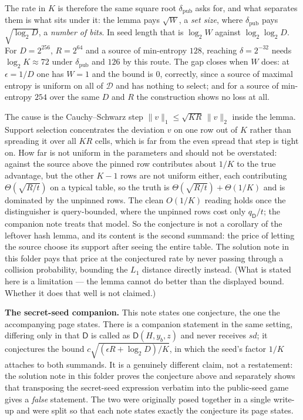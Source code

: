 \documentclass{aicr-conjecture}
\newcommand{\sd}{\mathit{sd}}
\newcommand{\calD}{\mathcal{D}}
\begin{document}
\begin{remark}
The rate in $K$ is therefore the same square root $\delta_{\mathrm{pub}}$ asks for, and what
separates them is what sits under it: the lemma pays $\sqrt{W}$, a \emph{set size}, where
$\delta_{\mathrm{pub}}$ pays $\sqrt{\log_2 D}$, a \emph{number of bits}. In seed length that is
$\log_2 W$ against $\log_2\log_2 D$. For $D = 2^{256}$, $R = 2^{64}$ and a source of min-entropy
$128$, reaching $\delta = 2^{-32}$ needs $\log_2 K \approx 72$ under $\delta_{\mathrm{pub}}$ and
$126$ by this route. The gap closes when $W$ does: at $\epsilon = 1/D$ one has $W = 1$ and the bound
is $0$, correctly, since a source of maximal entropy is uniform on all of $\calD$ and has nothing to
select; and for a source of min-entropy $254$ over the same $D$ and $R$ the construction shows no
loss at all.

The cause is the Cauchy--Schwarz step $\|v\|_1 \le \sqrt{KR}\,\|v\|_2$ inside the lemma. Support
selection concentrates the deviation $v$ on one row out of $K$ rather than spreading it over all
$KR$ cells, which is far from the even spread that step is tight on. How far is not uniform in the
parameters and should not be overstated: against the source above the pinned row contributes about
$1/K$ to the true advantage, but the other $K-1$ rows are not uniform either, each contributing
$\Theta(\sqrt{R/t})$ on a typical table, so the truth is $\Theta(\sqrt{R/t}) + \Theta(1/K)$ and is
dominated by the unpinned rows. The clean $O(1/K)$ reading holds once the distinguisher is
query-bounded, where the unpinned rows cost only $q_{\mathsf{D}}/t$; the companion note treats that
model. So the conjecture is not a
corollary of the leftover hash lemma, and its content is the second summand: the price of letting
the source choose its support after seeing the entire table. The solution note in this folder pays
that price at the conjectured rate by never passing through a collision probability, bounding the
$L_1$ distance directly instead. (What is stated here is a limitation --- the lemma cannot do better
than the displayed bound. Whether it does that well is not claimed.)
\end{remark}

\bigskip
\noindent\textbf{The secret-seed companion.}
This note states one conjecture, the one the accompanying page states. There is a companion
statement in the same setting, differing only in that $\mathsf{D}$ is called as
$\mathsf{D}(H, y_b, z)$ and never receives $\sd$; it conjectures the bound
$c\sqrt{(\epsilon R + \log_2 D)/K}$, in which the seed's factor $1/K$ attaches to both summands.
It is a genuinely different claim, not a restatement: the solution note in this folder proves the
conjecture above and separately shows that transposing the secret-seed expression verbatim into the
public-seed game gives a \emph{false} statement. The two were originally posed together in a single
write-up and were split so that each note states exactly the conjecture its page states.
\end{document}
